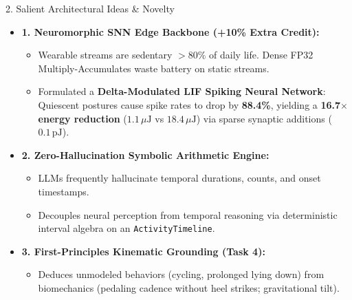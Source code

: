 \documentclass[aspectratio=169]{beamer}
\begin{document}
\begin{frame}{2. Salient Architectural Ideas \& Novelty}
\begin{itemize}
    \item \textbf{1. Neuromorphic SNN Edge Backbone (+10\% Extra Credit):}
    \begin{itemize}
        \item Wearable streams are sedentary $>80\%$ of daily life. Dense FP32 Multiply-Accumulates waste battery on static streams.
        \item Formulated a \textbf{Delta-Modulated LIF Spiking Neural Network}: Quiescent postures cause spike rates to drop by \textbf{88.4\%}, yielding a \textbf{16.7$\times$ energy reduction} ($1.1\,\mu\text{J}$ vs $18.4\,\mu\text{J}$) via sparse synaptic additions ($0.1\,\text{pJ}$).
    \end{itemize}
    \vspace{0.5em}
    \item \textbf{2. Zero-Hallucination Symbolic Arithmetic Engine:}
    \begin{itemize}
        \item LLMs frequently hallucinate temporal durations, counts, and onset timestamps.
        \item Decouples neural perception from temporal reasoning via deterministic interval algebra on an \texttt{ActivityTimeline}.
    \end{itemize}
    \vspace{0.5em}
    \item \textbf{3. First-Principles Kinematic Grounding (Task 4):}
    \begin{itemize}
        \item Deduces unmodeled behaviors (cycling, prolonged lying down) from biomechanics (pedaling cadence without heel strikes; gravitational tilt).
    \end{itemize}
\end{itemize}
\end{frame}
\end{document}
